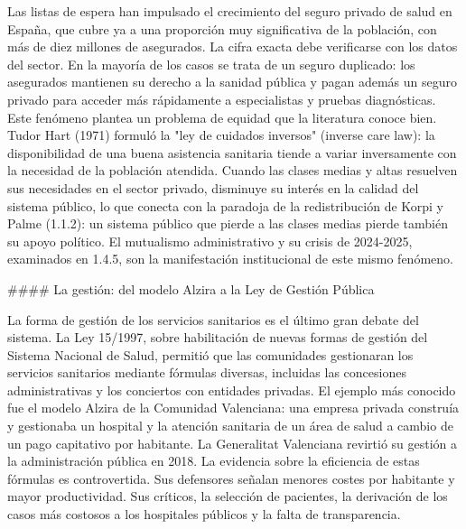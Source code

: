 \documentclass[10pt,a4paper]{article}
\begin{document}
Las listas de espera han impulsado el crecimiento del seguro privado de salud en España, que cubre ya a una proporción muy significativa de la población, con más de diez millones de asegurados. La cifra exacta debe verificarse con los datos del sector. En la mayoría de los casos se trata de un seguro duplicado: los asegurados mantienen su derecho a la sanidad pública y pagan además un seguro privado para acceder más rápidamente a especialistas y pruebas diagnósticas. Este fenómeno plantea un problema de equidad que la literatura conoce bien. Tudor Hart (1971) formuló la "ley de cuidados inversos" (inverse care law): la disponibilidad de una buena asistencia sanitaria tiende a variar inversamente con la necesidad de la población atendida. Cuando las clases medias y altas resuelven sus necesidades en el sector privado, disminuye su interés en la calidad del sistema público, lo que conecta con la paradoja de la redistribución de Korpi y Palme (1.1.2): un sistema público que pierde a las clases medias pierde también su apoyo político. El mutualismo administrativo y su crisis de 2024-2025, examinados en 1.4.5, son la manifestación institucional de este mismo fenómeno.

#### La gestión: del modelo Alzira a la Ley de Gestión Pública

La forma de gestión de los servicios sanitarios es el último gran debate del sistema. La Ley 15/1997, sobre habilitación de nuevas formas de gestión del Sistema Nacional de Salud, permitió que las comunidades gestionaran los servicios sanitarios mediante fórmulas diversas, incluidas las concesiones administrativas y los conciertos con entidades privadas. El ejemplo más conocido fue el modelo Alzira de la Comunidad Valenciana: una empresa privada construía y gestionaba un hospital y la atención sanitaria de un área de salud a cambio de un pago capitativo por habitante. La Generalitat Valenciana revirtió su gestión a la administración pública en 2018. La evidencia sobre la eficiencia de estas fórmulas es controvertida. Sus defensores señalan menores costes por habitante y mayor productividad. Sus críticos, la selección de pacientes, la derivación de los casos más costosos a los hospitales públicos y la falta de transparencia.
\end{document}
